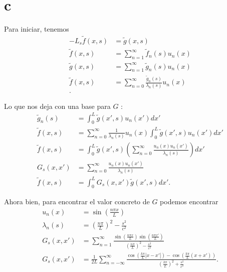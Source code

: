 \documentclass{report}
\begin{document}
\section{c}

Para iniciar, tenemos
\begin{align*}
  -L_s \tilde{f}\left( x, s \right) &= \tilde{g}\left( x, s \right)  \\
  \tilde{f}\left( x, s \right) &= \sum_{n=1}^{\infty} \tilde{f}_n\left( s \right) u_n\left( x \right)  \\
  \tilde{g}\left( x, s \right) &= \sum_{n=1}^{\infty} \tilde{g}_n\left( s \right) u_n\left( x \right)  \\
  \tilde{f}\left( x, s \right) &= \sum_{n=0}^{\infty} \frac{\tilde{g}_n\left( s \right) }{\lambda_n \left( s \right) }u_n\left( x \right)  \\
.\end{align*}

Lo que nos deja con una base para $G$ :
\begin{align*}
  \tilde{g}_n\left( s \right) &= \int_{0}^{L}\tilde{g}\left( x', s \right) u_n\left( x' \right) dx' \\
  \tilde{f}\left( x, s \right) &= \sum_{n=0}^{\infty} \frac{1}{\lambda_n\left( s \right) }u_n\left( x \right) \int_{0}^{L}\tilde{g}\left( x', s \right) u_n\left( x' \right) dx' \\
  \tilde{f}\left( x, s \right) &= \int_{0}^{L}\tilde{g}\left( x', s \right) \left( \sum_{n=0}^{\infty} \frac{u_n\left( x \right) u_n\left( x' \right) }{\lambda_n\left( s \right) } \right) dx' \\
  G_s\left( x, x' \right) &= \sum_{n=0}^{\infty} \frac{u_n\left( x \right) u_n\left( x' \right) }{\lambda_n\left( s \right) } \\
  \tilde{f}\left( x, s \right) &= \int_{0}^{L} G_s\left( x, x' \right) \tilde{g}\left( x', s \right) dx'
.\end{align*}

Ahora bien, para encontrar el valor concreto de $G$ podemos encontrar
\begin{align*}
  u_n\left( x \right) &= \sin\left( \frac{n\pi x}{L} \right)  \\
  \lambda_n\left( s \right) &= \left( \frac{n\pi}{L} \right)^2 - \frac{s^2}{c^2} \\
  G_s\left( x, x' \right) &= \sum_{n=1}^{\infty} \frac{\sin\left( \frac{n\pi x}{L} \right) \sin\left( \frac{n\pi x'}{L} \right) }{\left( \frac{n\pi}{L} \right)^2 - \frac{s^2}{c^2}}\\
  G_s\left( x, x' \right) &= \frac{1}{2L}\sum_{n=-\infty}^{\infty} \frac{\cos\left( \frac{k\pi}{L}\left| x - x' \right|  \right) - \cos\left( \frac{k\pi}{L}\left( x + x' \right)  \right) }{\left( \frac{k\pi}{L} \right) ^2 + \frac{s^2}{c^2}}
.\end{align*}
\end{document}
